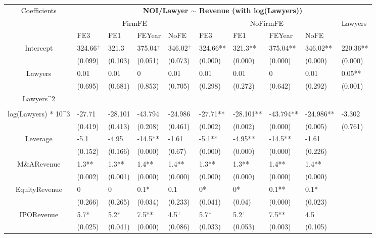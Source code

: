 \documentclass{article}
\begin{document}
\begin{table}[H]
\centering
\begin{tabular}{|clllllllll|}
\hline
\multirow{3}{*}{Coefficients} & \multicolumn{9}{c|}{\textbf{NOI/Lawyer $\sim$ Revenue (with log(Lawyers))}} \\
\cline{2-10}
& \multicolumn{4}{c}{FirmFE} & \multicolumn{4}{c}{NoFirmFE} & \multirow{2}{*}{Lawyers} \\
\cline{2-9}
& FE3 & FE1 & FEYear & NoFE & FE3 & FE1 & FEYear & NoFE &  \\
\hline
 
Intercept & 324.66$^{+}$ & 321.3 & 375.04$^{+}$ & 346.02$^{+}$ & 324.66** & 321.3** & 375.04** & 346.02** & 220.36** \\ 
   & (0.099) & (0.103) & (0.051) & (0.073) & (0.000) & (0.000) & (0.000) & (0.000) & (0.000) \\ 
  Lawyers & 0.01 & 0.01 & 0 & 0.01 & 0.01 & 0.01 & 0 & 0.01 & 0.05** \\ 
   & (0.695) & (0.681) & (0.853) & (0.705) & (0.298) & (0.272) & (0.642) & (0.292) & (0.001) \\ 
  Lawyers^2 &  &  &  &  &  &  &  &  &  \\ 
   &  &  &  &  &  &  &  &  &  \\ 
  log(Lawyers) * 10^3 & -27.71 & -28.101 & -43.794 & -24.986 & -27.71** & -28.101** & -43.794** & -24.986** & -3.302 \\ 
   & (0.419) & (0.413) & (0.208) & (0.461) & (0.002) & (0.002) & (0.000) & (0.005) & (0.761) \\ 
  Leverage & -5.1 & -4.95 & -14.5** & -1.61 & -5.1** & -4.95** & -14.5** & -1.61 &  \\ 
   & (0.152) & (0.166) & (0.000) & (0.67) & (0.000) & (0.000) & (0.000) & (0.226) &  \\ 
  M\&ARevenue & 1.3** & 1.3** & 1.4** & 1.4** & 1.3** & 1.3** & 1.4** & 1.4** &  \\ 
   & (0.002) & (0.001) & (0.000) & (0.000) & (0.000) & (0.000) & (0.000) & (0.000) &  \\ 
  EquityRevenue & 0 & 0 & 0.1* & 0.1 & 0* & 0* & 0.1** & 0.1* &  \\ 
   & (0.266) & (0.265) & (0.034) & (0.233) & (0.041) & (0.04) & (0.000) & (0.023) &  \\ 
  IPORevenue & 5.7* & 5.2* & 7.5** & 4.5$^{+}$ & 5.7* & 5.2$^{+}$ & 7.5** & 4.5 &  \\ 
   & (0.025) & (0.041) & (0.000) & (0.086) & (0.033) & (0.053) & (0.003) & (0.105) &  \\ 

\end{tabular}
\end{table}
\end{document}
